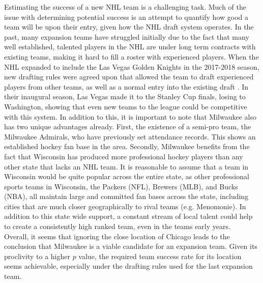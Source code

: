 \documentclass[11pt]{report}            %
\begin{document}
\begin{description}
Estimating the success of a new NHL team is a challenging task. Much of the issue with determining potential success is an attempt to quantify how good a team will be upon their entry, given how the NHL draft system operates. In the past, many expansion teams have struggled initially due to the fact that many well established, talented players in the NHL are under long term contracts with existing teams, making it hard to fill a roster with experienced players. When the NHL expanded to include the Las Vegas Golden Knights in the 2017-2018 season, new drafting rules were agreed upon that allowed the team to draft experienced players from other teams, as well as a normal entry into the existing draft \cite{draft}. In their inaugural season, Las Vegas made it to the Stanley Cup finals, losing to Washington, showing that even new teams to the league could be competitive with this system. In addition to this, it is important to note that Milwaukee also has two unique advantages already. First, the existence of a semi-pro team, the Milwaukee Admirals, who have previously set attendance records. This shows an established hockey fan base in the area. Secondly, Milwaukee benefits from the fact that Wisconsin has produced more professional hockey players than any other state that lacks an NHL team\cite{wisco}. It is reasonable to assume that a team in Wisconsin would be quite popular across the entire state, as other professional sports teams in Wisconsin, the Packers (NFL), Brewers (MLB), and Bucks (NBA), all maintain large and committed fan bases across the state, including cities that are much closer geographically to rival teams (e.g. Menomonie). In addition to this state wide support, a constant stream of local talent could help to create a consistently high ranked team, even in the teams early years.\\
Overall, it seems that ignoring the close location of Chicago leads to the conclusion that Milwaukee is a viable candidate for an expansion team. Given its proclivity to a higher $p$ value, the required team success rate for its location seems achievable, especially under the drafting rules used for the last expansion team.

\end{description}
\end{document}
